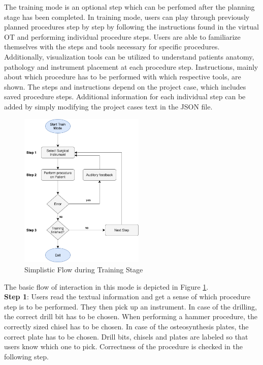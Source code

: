 The training mode is an optional step which can be perfomed after the planning stage has been completed.
In training mode, users can play through previously planned procedures step by step by following the instructions found in the virtual OT and performing individual procedure steps.
Users are able to familiarize themselves with the steps and tools necessary for specific procedures.
Additionally, visualization tools can be utilized to understand patients anatomy, pathology and instrument placement at each procedure step.
Instructions, mainly about which procedure has to be performed with which respective tools, are shown.
The steps and instructions depend on the project case, which includes saved procedure steps.
Additional information for each individual step can be added by simply modifying the project cases text in the JSON file.

\begin{figure}[ht]
    \centering
    \includegraphics[width=225px]{images/implementation/features/training/training_flow.png}
    \caption{\label{fig::TrainingFlow}Simplistic Flow during Training Stage}
\end{figure}

The basic flow of interaction in this mode is depicted in Figure \ref{fig::TrainingFlow}.
\\
\textbf{Step 1}: Users read the textual information and get a sense of which procedure step is to be performed.
They then pick up an instrument. In case of the drilling, the correct drill bit has to be chosen.
When performing a hammer procedure, the correctly sized chisel has to be chosen.
In case of the osteosynthesis plates, the correct plate has to be chosen.
Drill bits, chisels and plates are labeled so that users know which one to pick.
Correctness of the procedure is checked in the following step.


